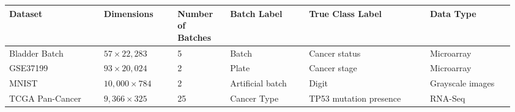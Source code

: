\begin{tabular}{|p{0.18\linewidth}|p{0.14\linewidth}|p{0.1\linewidth}|p{0.15\linewidth}|p{0.23\linewidth}|p{0.16\linewidth}|}
  \hline
  Dataset         & Dimensions   & Number of Batches & Batch Label      & True Class Label       & Data Type        \\
  \hline
  Bladder Batch   & $57\times22,283$  & 5                 & Batch            & Cancer status          & Microarray       \\
  \hline
  GSE37199        & $93\times20,024$  & 2                 & Plate            & Cancer stage           & Microarray       \\
  \hline
  MNIST           & $10,000\times784$ & 2                 & Artificial batch & Digit                  & Grayscale images \\
  \hline
  TCGA Pan-Cancer & $9,366\times325$  & 25                & Cancer Type      & TP53 mutation presence & RNA-Seq \\
  \hline
\end{tabular}
